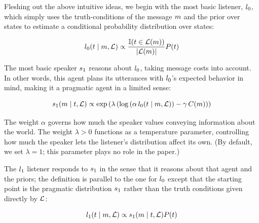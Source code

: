 Fleshing out the above intuitive ideas, we begin with the most basic
listener, $\listenerZero$, which simply uses the truth-conditions of
the message $m$ and the prior over states to estimate a conditional
probability distribution over states:

\begin{definition}[$\listenerZero$]\label{def:l0}
  \[
  l_{0}(t \mid m, \mathcal{L})
  \propto
  \frac{\mathbb{I}(t \in \mathcal{L}(m))}{|\mathcal{L}(m)|}
  P(t)
  \]
\end{definition}

The most basic speaker $\speakerOne$ reasons about $\listenerZero$,
taking message costs into account. In other words, this agent plans
its utterances with $\listenerZero$'s expected behavior in mind,
making it a pragmatic agent in a limited sense:



\begin{definition}[$\speakerOne$]\label{def:s1}  
  \[
  s_{1}(m \mid t, \mathcal{L}) 
  \propto
  \exp
  \left(
    \lambda
    \left(
      \log
      \left(
        \alpha 
        \,
        l_{0}(t \mid m, \mathcal{L})
      \right)
      - \gamma \, C(m)
     \right)
  \right)
  \]
\end{definition}

The weight $\alpha$ governs how much the speaker values conveying
information about the world.  The weight $\lambda > 0$ functions as a
temperature parameter, controlling how much the speaker lets the
listener's distribution affect its own. (By default, we set $\lambda =
1$; this parameter plays no role in the paper.)

The $\listenerOne$ listener responds to $\speakerOne$ in the sense
that it reasons about that agent and the priors; the definition is
parallel to the one for $\listenerZero$ except that the starting point
is the pragmatic distribution $\speakerOne$ rather than the truth
conditions given directly by $\mathcal{L}$:

\begin{definition}[$\listenerOne$]\label{def:l1}
  \[
  l_{1}(t \mid m, \mathcal{L}) 
  \propto 
  s_{1}(m \mid t, \mathcal{L})P(t)
  \]
\end{definition}

